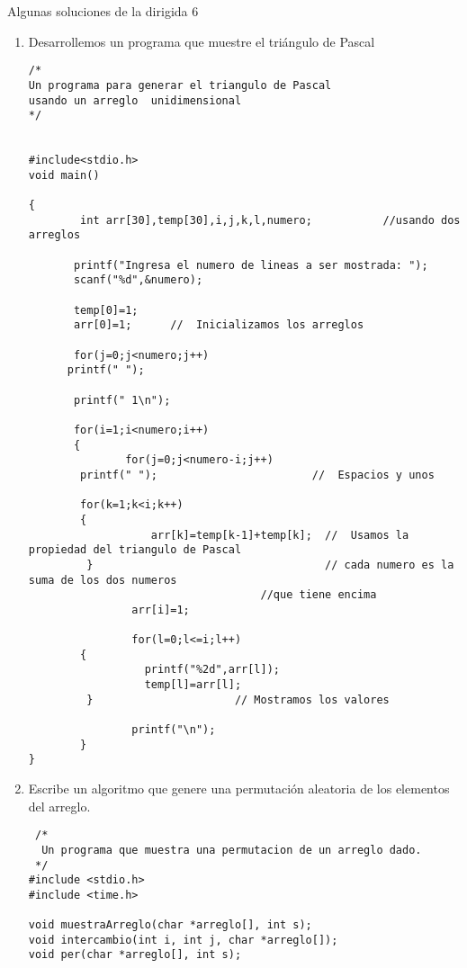 \documentclass[twoside,10.5pt]{article}%
\begin{document}
\begin{center}
{\LARGE{Algunas soluciones de la  dirigida 6}}\\[20pt]
\end{center}

\vspace{0.3cm}

\begin{enumerate}
\item Desarrollemos un programa que muestre el tri\'angulo de Pascal


\begin{verbatim}
/*
Un programa para generar el triangulo de Pascal
usando un arreglo  unidimensional
*/


#include<stdio.h>
void main()

{
        int arr[30],temp[30],i,j,k,l,numero;           //usando dos arreglos 
      
       printf("Ingresa el numero de lineas a ser mostrada: ");
       scanf("%d",&numero);

       temp[0]=1;
       arr[0]=1;      //  Inicializamos los arreglos

       for(j=0;j<numero;j++)
      printf(" ");

       printf(" 1\n");

       for(i=1;i<numero;i++)
       {
               for(j=0;j<numero-i;j++)
        printf(" ");                        //  Espacios y unos 

        for(k=1;k<i;k++)
        {
                   arr[k]=temp[k-1]+temp[k];  //  Usamos la propiedad del triangulo de Pascal
         }                                    // cada numero es la suma de los dos numeros 
         							//que tiene encima
                arr[i]=1;

                for(l=0;l<=i;l++)
        {
                  printf("%2d",arr[l]);
                  temp[l]=arr[l];
         }						// Mostramos los valores

                printf("\n");
        }
}
\end{verbatim}
 \item Escribe un algoritmo que genere una permutaci\'on aleatoria de los elementos del arreglo.
 
 \begin{verbatim}
 /*
  Un programa que muestra una permutacion de un arreglo dado.
 */
#include <stdio.h>
#include <time.h>

void muestraArreglo(char *arreglo[], int s);
void intercambio(int i, int j, char *arreglo[]);
void per(char *arreglo[], int s);



\end{verbatim}
\end{enumerate}
\end{document}
